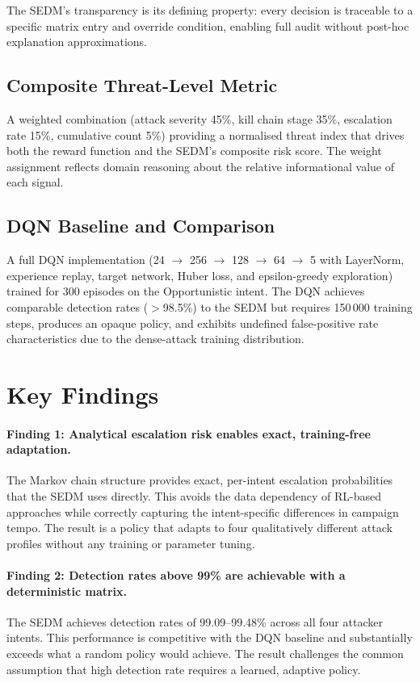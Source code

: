The SEDM's transparency is its defining property: every decision is traceable
to a specific matrix entry and override condition, enabling full audit without
post-hoc explanation approximations.

\subsection{Composite Threat-Level Metric}

A weighted combination (attack severity 45\%, kill chain stage 35\%,
escalation rate 15\%, cumulative count 5\%) providing a normalised threat
index that drives both the reward function and the SEDM's composite risk score.
The weight assignment reflects domain reasoning about the relative informational
value of each signal.

\subsection{DQN Baseline and Comparison}

A full DQN implementation (24 $\to$ 256 $\to$ 128 $\to$ 64 $\to$ 5 with
LayerNorm, experience replay, target network, Huber loss, and epsilon-greedy
exploration) trained for 300 episodes on the Opportunistic intent.
The DQN achieves comparable detection rates ($>$98.5\%) to the SEDM but requires
150\,000 training steps, produces an opaque policy, and exhibits undefined
false-positive rate characteristics due to the dense-attack training distribution.

\section{Key Findings}

\paragraph{Finding 1: Analytical escalation risk enables exact, training-free adaptation.}
The Markov chain structure provides exact, per-intent escalation probabilities
that the SEDM uses directly.
This avoids the data dependency of RL-based approaches while correctly
capturing the intent-specific differences in campaign tempo.
The result is a policy that adapts to four qualitatively different attack
profiles without any training or parameter tuning.

\paragraph{Finding 2: Detection rates above 99\% are achievable with a deterministic matrix.}
The SEDM achieves detection rates of 99.09--99.48\% across all four attacker
intents.
This performance is competitive with the DQN baseline and substantially
exceeds what a random policy would achieve.
The result challenges the common assumption that high detection rate requires
a learned, adaptive policy.

